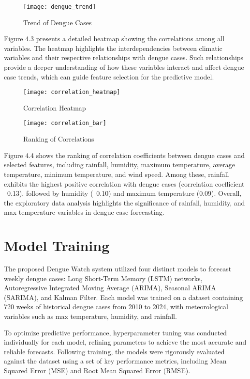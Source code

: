 \begin{figure}[ht]
	\centering
	\texttt{[image: dengue\_trend]}
	\caption{Trend of Dengue Cases}
	\label{fig:data_trend}
\end{figure}

Figure 4.3 presents a detailed heatmap showing the correlations among all variables. The heatmap highlights the interdependencies between climatic variables and their respective relationships with dengue cases. Such relationships provide a deeper understanding of how these variables interact and affect dengue case trends, which can guide feature selection for the predictive model.

\begin{figure}[H]
	\centering
	\texttt{[image: correlation\_heatmap]}
	\caption{Correlation Heatmap}
	\label{fig:correlation_heatmap}
\end{figure}

\begin{figure}[ht]
	\centering
	\texttt{[image: correlation\_bar]}
	\caption{Ranking of Correlations}
	\label{fig:correlation_bar}
\end{figure}

Figure 4.4 shows the ranking of correlation coefficients between dengue cases and selected features, including rainfall, humidity, maximum temperature, average temperature, minimum temperature, and wind speed. Among these, rainfall exhibits the highest positive correlation with dengue cases (correlation coefficient ~0.13), followed by humidity (~0.10) and maximum temperature (0.09). Overall, the exploratory data analysis highlights the significance of rainfall, humidity, and max temperature variables in dengue case forecasting.

\section{Model Training}
The proposed Dengue Watch system utilized four distinct models to forecast weekly dengue cases: Long Short-Term Memory (LSTM) networks, Autoregressive Integrated Moving Average (ARIMA), Seasonal ARIMA (SARIMA), and Kalman Filter. Each model was trained on a dataset containing 720 weeks of historical dengue cases from 2010 to 2024, with meteorological variables such as max temperature, humidity, and rainfall.

To optimize predictive performance, hyperparameter tuning was conducted individually for each model, refining parameters to achieve the most accurate and reliable forecasts. Following training, the models were rigorously evaluated against the dataset using a set of key performance metrics, including Mean Squared Error (MSE) and Root Mean Squared Error (RMSE).

